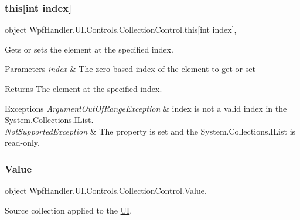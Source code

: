 \subsubsection{\texorpdfstring{this[int index]}{this[int index]}}
{\footnotesize\ttfamily object Wpf\+Handler.\+U\+I.\+Controls.\+Collection\+Control.\+this\mbox{[}int index\mbox{]}\hspace{0.3cm}{\ttfamily [get]}, {\ttfamily [set]}}



Gets or sets the element at the specified index. 


\begin{DoxyParams}{Parameters}
{\em index} & The zero-\/based index of the element to get or set\\
\hline
\end{DoxyParams}
\begin{DoxyReturn}{Returns}
The element at the specified index.
\end{DoxyReturn}

\begin{DoxyExceptions}{Exceptions}
{\em Argument\+Out\+Of\+Range\+Exception} & index is not a valid index in the System.\+Collections.\+I\+List. \\
\hline
{\em Not\+Supported\+Exception} & The property is set and the System.\+Collections.\+I\+List is read-\/only. \\
\hline
\end{DoxyExceptions}
\mbox{\label{class_wpf_handler_1_1_u_i_1_1_controls_1_1_collection_control_a130ec8fe8e45683069833138833e9356}} 
\subsubsection{\texorpdfstring{Value}{Value}}
{\footnotesize\ttfamily object Wpf\+Handler.\+U\+I.\+Controls.\+Collection\+Control.\+Value\hspace{0.3cm}{\ttfamily [get]}, {\ttfamily [set]}}



Source collection applied to the \mbox{\hyperlink{namespace_wpf_handler_1_1_u_i}{UI}}. 

